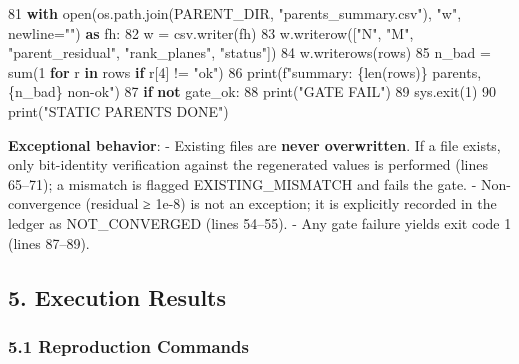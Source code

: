\documentclass[
  a4paper,
]{ltjsarticle}
\newenvironment{Shaded}{}{}
\newcommand{\BuiltInTok}[1]{\textcolor[rgb]{0.00,0.50,0.00}{#1}}
\newcommand{\ControlFlowTok}[1]{\textcolor[rgb]{0.00,0.44,0.13}{\textbf{#1}}}
\newcommand{\DecValTok}[1]{\textcolor[rgb]{0.25,0.63,0.44}{#1}}
\newcommand{\ImportTok}[1]{\textcolor[rgb]{0.00,0.50,0.00}{\textbf{#1}}}
\newcommand{\KeywordTok}[1]{\textcolor[rgb]{0.00,0.44,0.13}{\textbf{#1}}}
\newcommand{\NormalTok}[1]{#1}
\newcommand{\OperatorTok}[1]{\textcolor[rgb]{0.40,0.40,0.40}{#1}}
\newcommand{\SpecialCharTok}[1]{\textcolor[rgb]{0.25,0.44,0.63}{#1}}
\newcommand{\SpecialStringTok}[1]{\textcolor[rgb]{0.73,0.40,0.53}{#1}}
\newcommand{\StringTok}[1]{\textcolor[rgb]{0.25,0.44,0.63}{#1}}
\begin{document}
\begin{Shaded}
\begin{Highlighting}[]
    \DecValTok{81}      \ControlFlowTok{with} \BuiltInTok{open}\NormalTok{(os.path.join(PARENT\_DIR, }\StringTok{"parents\_summary.csv"}\NormalTok{), }\StringTok{"w"}\NormalTok{, newline}\OperatorTok{=}\StringTok{""}\NormalTok{) }\ImportTok{as}\NormalTok{ fh:}
    \DecValTok{82}\NormalTok{          w }\OperatorTok{=}\NormalTok{ csv.writer(fh)}
    \DecValTok{83}\NormalTok{          w.writerow([}\StringTok{"N"}\NormalTok{, }\StringTok{"M"}\NormalTok{, }\StringTok{"parent\_residual"}\NormalTok{, }\StringTok{"rank\_planes"}\NormalTok{, }\StringTok{"status"}\NormalTok{])}
    \DecValTok{84}\NormalTok{          w.writerows(rows)}
    \DecValTok{85}\NormalTok{      n\_bad }\OperatorTok{=} \BuiltInTok{sum}\NormalTok{(}\DecValTok{1} \ControlFlowTok{for}\NormalTok{ r }\KeywordTok{in}\NormalTok{ rows }\ControlFlowTok{if}\NormalTok{ r[}\DecValTok{4}\NormalTok{] }\OperatorTok{!=} \StringTok{"ok"}\NormalTok{)}
    \DecValTok{86}      \BuiltInTok{print}\NormalTok{(}\SpecialStringTok{f"summary: }\SpecialCharTok{\{}\BuiltInTok{len}\NormalTok{(rows)}\SpecialCharTok{\}}\SpecialStringTok{ parents, }\SpecialCharTok{\{}\NormalTok{n\_bad}\SpecialCharTok{\}}\SpecialStringTok{ non{-}ok"}\NormalTok{)}
    \DecValTok{87}      \ControlFlowTok{if} \KeywordTok{not}\NormalTok{ gate\_ok:}
    \DecValTok{88}          \BuiltInTok{print}\NormalTok{(}\StringTok{"GATE FAIL"}\NormalTok{)}
    \DecValTok{89}\NormalTok{          sys.exit(}\DecValTok{1}\NormalTok{)}
    \DecValTok{90}      \BuiltInTok{print}\NormalTok{(}\StringTok{"STATIC PARENTS DONE"}\NormalTok{)}
\end{Highlighting}
\end{Shaded}

\textbf{Exceptional behavior}: - Existing files are \textbf{never
overwritten}. If a file exists, only bit-identity verification against
the regenerated values is performed (lines 65--71); a mismatch is
flagged EXISTING\_MISMATCH and fails the gate. - Non-convergence
(residual ≥ 1e-8) is not an exception; it is explicitly recorded in the
ledger as NOT\_CONVERGED (lines 54--55). - Any gate failure yields exit
code 1 (lines 87--89).

\subsection{5. Execution Results}\label{execution-results}

\subsubsection{5.1 Reproduction Commands}\label{reproduction-commands}
\end{document}
